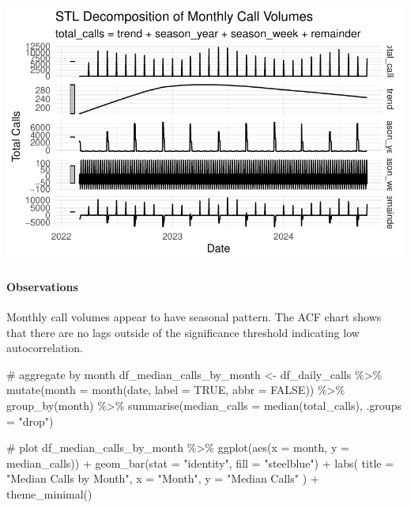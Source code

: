 \documentclass[
  letterpaper,
  DIV=11,
  numbers=noendperiod]{scrartcl}
\let\oldparagraph\paragraph
\renewcommand{\paragraph}[1]{\oldparagraph{#1}\mbox{}}
\newenvironment{Shaded}{\begin{snugshade}}{\end{snugshade}}
\newcommand{\AttributeTok}[1]{\textcolor[rgb]{0.40,0.45,0.13}{#1}}
\newcommand{\CommentTok}[1]{\textcolor[rgb]{0.37,0.37,0.37}{#1}}
\newcommand{\ConstantTok}[1]{\textcolor[rgb]{0.56,0.35,0.01}{#1}}
\newcommand{\FunctionTok}[1]{\textcolor[rgb]{0.28,0.35,0.67}{#1}}
\newcommand{\NormalTok}[1]{\textcolor[rgb]{0.00,0.23,0.31}{#1}}
\newcommand{\OtherTok}[1]{\textcolor[rgb]{0.00,0.23,0.31}{#1}}
\newcommand{\SpecialCharTok}[1]{\textcolor[rgb]{0.37,0.37,0.37}{#1}}
\newcommand{\StringTok}[1]{\textcolor[rgb]{0.13,0.47,0.30}{#1}}
\begin{document}
\includegraphics{final_proj_group1_files/figure-pdf/aggregate_monthly_stl-3.pdf}

\paragraph{Observations}\label{observations-7}

Monthly call volumes appear to have seasonal pattern. The ACF chart
shows that there are no lags outside of the significance threshold
indicating low autocorrelation.

\begin{Shaded}
\begin{Highlighting}[]
\CommentTok{\# aggregate by month}
\NormalTok{df\_median\_calls\_by\_month }\OtherTok{\textless{}{-}}\NormalTok{ df\_daily\_calls }\SpecialCharTok{\%\textgreater{}\%}
  \FunctionTok{mutate}\NormalTok{(}\AttributeTok{month =} \FunctionTok{month}\NormalTok{(date, }\AttributeTok{label =} \ConstantTok{TRUE}\NormalTok{, }\AttributeTok{abbr =} \ConstantTok{FALSE}\NormalTok{)) }\SpecialCharTok{\%\textgreater{}\%}
  \FunctionTok{group\_by}\NormalTok{(month) }\SpecialCharTok{\%\textgreater{}\%}
  \FunctionTok{summarise}\NormalTok{(}\AttributeTok{median\_calls =} \FunctionTok{median}\NormalTok{(total\_calls), }\AttributeTok{.groups =} \StringTok{"drop"}\NormalTok{)}

\CommentTok{\# plot }
\NormalTok{df\_median\_calls\_by\_month }\SpecialCharTok{\%\textgreater{}\%}
  \FunctionTok{ggplot}\NormalTok{(}\FunctionTok{aes}\NormalTok{(}\AttributeTok{x =}\NormalTok{ month, }\AttributeTok{y =}\NormalTok{ median\_calls)) }\SpecialCharTok{+} 
  \FunctionTok{geom\_bar}\NormalTok{(}\AttributeTok{stat =} \StringTok{"identity"}\NormalTok{, }\AttributeTok{fill =} \StringTok{"steelblue"}\NormalTok{) }\SpecialCharTok{+}
  \FunctionTok{labs}\NormalTok{(}
    \AttributeTok{title =} \StringTok{"Median Calls by Month"}\NormalTok{, }
    \AttributeTok{x =} \StringTok{"Month"}\NormalTok{, }
    \AttributeTok{y =} \StringTok{"Median Calls"}
\NormalTok{  ) }\SpecialCharTok{+} \FunctionTok{theme\_minimal}\NormalTok{()}
\end{Highlighting}
\end{Shaded}
\end{document}
